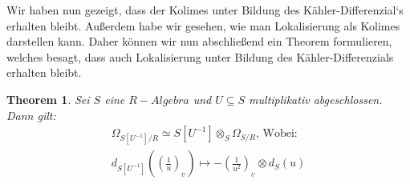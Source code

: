 \documentclass[10pt,a4paper]{report}
\newcommand{\comment}[1]{}
\newcounter{Aussage}[chapter]
\newtheorem{theorem}[Aussage]{Theorem}
\newcommand{\divR}[2]{\Omega_{#1/#2}}
\newcommand{\divf}[1]{d_{#1}}
\newcommand{\Tensor}[3]{#1 \otimes_{#2} #3}
\newcommand{\tensor}[3]{#1 \otimes #3}
\newcommand{\lok}[2]{#1 [#2^{-1}]}
\newcommand{\loke}[3]{(\frac{#1}{#2})_{_{#3}}}
\begin{document}
Wir haben nun gezeigt, dass der Kolimes unter Bildung des Kähler-Differenzial`s erhalten bleibt. Außerdem habe wir gesehen, wie man Lokalisierung als Kolimes darstellen kann. Daher können wir nun abschließend ein Theorem formulieren, welches besagt, dass auch Lokalisierung unter Bildung des Kähler-Differenzials erhalten bleibt.
\begin{theorem}\comment{\label{Lokalisierung des Kähler-Differenzials}}
Sei $S$ eine $R-Algebra$ und $U \subseteq S$ multiplikativ abgeschlossen.
Dann gilt:
\begin{gather*}
\divR{\lok{S}{U}}{R} \simeq \Tensor{\lok{S}{U}}{S}{\divR{S}{R}} \text{, Wobei:}\\
 \divf{\lok{S}{U}}(\loke{1}{u}{U}) \longmapsto -\tensor{\loke{1}{u^2}{U}}{S}{\divf{S}(u)}
\end{gather*}
\end{theorem}
\end{document}
